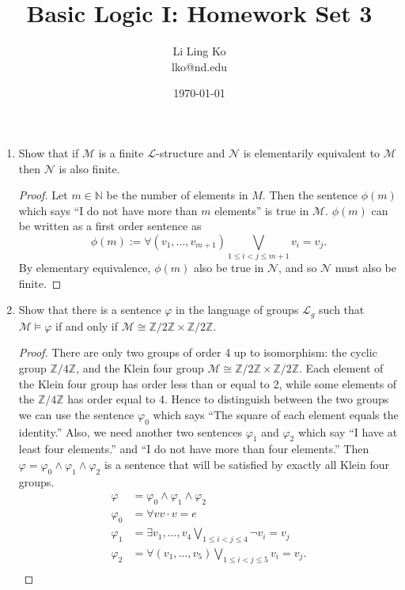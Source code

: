 \documentclass{article}
\begin{document}
\title{Basic Logic I: Homework Set 3}
\author{Li Ling Ko\\ lko@nd.edu}
\date{\today}
\maketitle

\begin{enumerate}
  \item Show that if $\mathcal{M}$ is a finite $\mathcal{L}$-structure and
    $\mathcal{N}$ is elementarily equivalent to $\mathcal{M}$ then
    $\mathcal{N}$ is also finite.
    \begin{proof}
      Let $m\in\mathbb{N}$ be the number of elements in $M$. Then the
      sentence $\phi(m)$ which says ``I do not have more than $m$
      elements'' is true in $\mathcal{M}$. $\phi(m)$ can be written as a
      first order sentence as
      \begin{equation*}
        \phi(m) := \forall(v_1,\ldots,v_{m+1}) \mathop{\bigvee}_{1\leq
        i<j\leq m+1} v_i=v_j.
      \end{equation*}
      By elementary equivalence, $\phi(m)$ also be true in $\mathcal{N}$,
      and so $\mathcal{N}$ must also be finite.
    \end{proof}

  \item Show that there is a sentence $\varphi$ in the language of groups
    $\mathcal{L}_g$ such that $\mathcal{M}\vDash\varphi$ if and only if
    $\mathcal{M}\cong\mathbb{Z}/2\mathbb{Z}\times\mathbb{Z}/2\mathbb{Z}$.
    \begin{proof}
      There are only two groups of order 4 up to isomorphism: the cyclic
      group $\mathbb{Z}/4\mathbb{Z}$, and the Klein four group
      $\mathcal{M}\cong\mathbb{Z}/2\mathbb{Z}\times\mathbb{Z}/2\mathbb{Z}$.
      Each element of the Klein four group has order less than or equal to
      2, while some elements of the $\mathbb{Z}/4\mathbb{Z}$ has order
      equal to 4. Hence to distinguish between the two groups we can use
      the sentence $\varphi_0$ which says ``The square of each element
      equals the identity.'' Also, we need another two sentences
      $\varphi_1$ and $\varphi_2$ which say ``I have at least four
      elements.'' and ``I do not have more than four elements.'' Then
      $\varphi=\varphi_0\wedge\varphi_1\wedge\varphi_2$ is a sentence that
      will be satisfied by exactly all Klein four groups.
      \begin{align*}
        \varphi   &= \varphi_0\wedge\varphi_1\wedge\varphi_2 \\
        \varphi_0 &= \forall v v\cdot v=e \\
        \varphi_1 &= \exists v_1,\ldots,v_4 \bigvee_{1\leq i<j\leq 4} \neg
                      v_i=v_j \\
        \varphi_2 &= \forall(v_1,\ldots,v_5) \mathop{\bigvee}_{1\leq
                      i<j\leq 5} v_i=v_j. \\
      \end{align*}
    \end{proof}


\end{enumerate}
\end{document}
